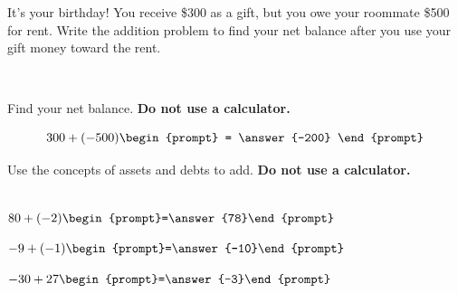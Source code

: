 \documentclass{ximera}[font=12pt]
\begin{document}
\begin{problem}
It's your birthday!  You receive \$300 as a gift, but you owe your roommate \$500 for rent. Write the addition problem to 
find your net balance after you use your gift money toward the rent.

~ \\[3em]
\begin{multipleChoice}
\end{multipleChoice}


\begin{problem} %
Find your net balance.  \textbf{Do not use a calculator.}

\[ 300 + (-500) \begin{prompt} = \answer{-200} \end{prompt} \]

\end{problem}

\end{problem}

\begin{problem}
Use the concepts of assets and debts to add.  \textbf{Do not use a calculator.}

~ \\[1em]

$ 80 + (-2)  \begin{prompt}=\answer{78}\end{prompt} $

$ -9 + (-1)  \begin{prompt}=\answer{-10}\end{prompt} $

$ -30 + 27 \begin{prompt}=\answer{-3}\end{prompt} $

\end{problem}
\end{document}
